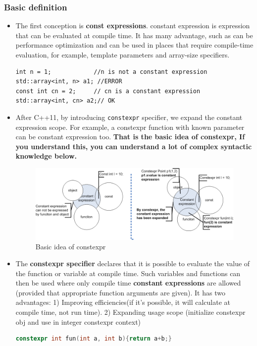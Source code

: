 \documentclass[a4paper,11pt,twoside]{book}
\begin{document}
\subsubsection{Basic definition}
\begin{itemize}
	
	\item The first conception is \textbf{const expressions}. constant expression is expression that can be evaluated at compile time. It has many advantage, such as can be performance optimization and can be used in places that require compile-time evaluation, for example, template parameters and array-size specifiers.
\begin{lstlisting}
int n = 1;            //n is not a constant expression
std::array<int, n> a1; //ERROR 
const int cn = 2;     // cn is a constant expression
std::array<int, cn> a2;// OK 
\end{lstlisting}
	
	\item After C++11, by introducing \texttt{constexpr} specifier, we expand the constant expression scope. For example, a constexpr function with known parameter can be constant expression too. \textbf{That is the basic idea of constexpr, If you understand this, you can understand a lot of complex syntactic knowledge below.}
	\begin{figure}[h]
		\centering
		\includegraphics[width=0.9\linewidth]{pics/constexpr.png}
		\caption{Basic idea of constexpr}
		\label{fig:constexpr}
	\end{figure}
	
	\item The \textbf{constexpr specifier} declares that it is possible to evaluate the value of the function or variable at compile time. Such variables and functions can then be used where only compile time \textbf{constant expressions} are allowed (provided that appropriate function arguments are given). It has two advantages: 1) Improving efficiencies(if it's possible, it will calculate at compile time, not run time). 2) Expanding usage scope (initialize constexpr obj and use in integer constexpr context)
\begin{lstlisting}[frame=single, language=c++]
constexpr int fun(int a, int b){return a+b;}
	

\end{lstlisting}
\end{itemize}
\end{document}
